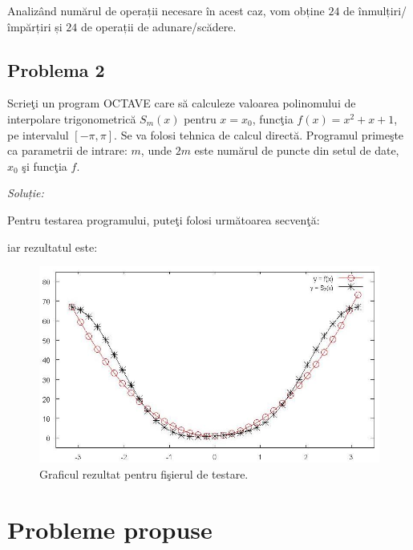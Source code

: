 \documentclass{exam}
\newcommand{\octavescript}[2]{
	
}
\begin{document}
Analizând numărul de operații necesare în acest caz, vom obține $24$ de înmulțiri/împărțiri și $24$ de operații de adunare/scădere.

\subsection{Problema 2}
Scrieţi un program OCTAVE care să calculeze valoarea polinomului de interpolare trigonometrică  $S_m(x)$ pentru $x = x_0$, funcţia $f(x) = x^2 + x + 1$,  pe intervalul  $[ -\pi, \pi]$. Se va folosi tehnica de calcul directă. Programul primeşte ca parametrii de intrare: $m$, unde $2m$ este numărul de puncte din setul de date, $x_0$ şi funcţia $f$.

\textit{Soluție:}

\octavescript{./src/PolinomTrigonometric.m}{Funcţie pentru calcularea polinomului de interpolare trigonometrică.}

Pentru testarea programului, puteţi folosi următoarea secvenţă:
\octavescript{./src/testare.m}{Fişier de testare.}

iar rezultatul este:

\begin{figure}[ht]
	\begin{center}
		\includegraphics[width=139mm]{./img/poltrigo} %
		\caption{Graficul rezultat pentru fişierul de testare.}
	\end{center}
	\label{metoda pozitiei false}
\end{figure}

\section{Probleme propuse}
\end{document}
